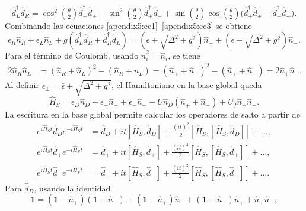 \begin{appendixs}
\begin{equation}
    \hat{d}^{\dagger}_{L}\hat{d}_{R} =
    \cos^{2}(\tfrac{\theta}{2})\hat{d}^{\dagger}_{-}\hat{d}_{+}
    - \sin^{2}(\tfrac{\theta}{2}) \hat{d}^{\dagger}_{+}\hat{d}_{-}
    + \sin(\tfrac{\theta}{2})\cos(\tfrac{\theta}{2})\big( \hat{d}^{\dagger}_{+}\hat{d}_{+} - \hat{d}^{\dagger}_{-}\hat{d}_{-} \big).
    \label{apendix5:ec3}
\end{equation}
Combinando las ecuaciones \eqref{apendix5:ec1}–\eqref{apendix5:ec3} se obtiene
\begin{equation*}
    \epsilon_{R} \hat{n}_{R} + \epsilon_{L} \hat{n}_{L}
    + g( \hat{d}^{\dagger}_{L}\hat{d}_{R} + \hat{d}^{\dagger}_{R}\hat{d}_{L} )
    = (\bar{\epsilon} + \sqrt{\Delta^{2} + g^{2}})\hat{n}_{+}
    +  (\bar{\epsilon} - \sqrt{\Delta^{2} + g^{2}})\hat{n}_{-}.
\end{equation*}
Para el término de Coulomb, usando $\hat{n}^{2}_{i} = \hat{n}_{i}$, se tiene
\begin{align*}
    2 \hat{n}_{R}\hat{n}_{L}
    &= (\hat{n}_{R} +\hat{n}_{L})^{2} - (\hat{n}_{R} + \hat{n}_{L})
     = (\hat{n}_{+} +\hat{n}_{-})^{2} - (\hat{n}_{+} + \hat{n}_{-})
     = 2\hat{n}_{+}\hat{n}_{-}.
\end{align*}
Al definir $\epsilon_{\pm} = \bar{\epsilon} \pm \sqrt{\Delta^{2}+g^{2}}$, el Hamiltoniano en la base global queda
\begin{equation}
    \hat{H}_{S} = \epsilon_{D}\hat{n}_{D} + \epsilon_{+}\hat{n}_{+} + \epsilon_{-}\hat{n}_{-}
    + U\hat{n}_{D}(\hat{n}_{+} + \hat{n}_{-}) + U_{f}\hat{n}_{+}\hat{n}_{-}.
    \label{apendix5:ec4}
\end{equation}
La escritura en la base global permite calcular los operadores de salto a partir de
\begin{align*}
    e^{i \hat{H}_{S}t}\hat{d}_{D}e^{-i\hat{H}_{S}t} & = \hat{d}_{D} + it[\hat{H}_{S},\hat{d}_{D}] + \frac{(it)^{2}}{2} [\hat{H}_{S},[\hat{H}_{S},\hat{d}_{D}]] + \dots, \\
    e^{i \hat{H}_{S}t}\hat{d}_{+}e^{-i\hat{H}_{S}t} & = \hat{d}_{+} + it[\hat{H}_{S},\hat{d}_{+}] + \frac{(it)^{2}}{2} [\hat{H}_{S},[\hat{H}_{S},\hat{d}_{+}]] + \dots, \\
    e^{i \hat{H}_{S}t}\hat{d}_{-}e^{-i\hat{H}_{S}t} & = \hat{d}_{-} + it[\hat{H}_{S},\hat{d}_{-}] + \frac{(it)^{2}}{2} [\hat{H}_{S},[\hat{H}_{S},\hat{d}_{-}]] + \dots.
\end{align*}
Para $\hat{d}_{D}$, usando la identidad
\[
\mathbf{1} = (\mathbf{1} - \hat{n}_{+})(\mathbf{1}-\hat{n}_{-}) + (\mathbf{1} - \hat{n}_{+})\hat{n}_{-} + (\mathbf{1} - \hat{n}_{-})\hat{n}_{+} + \hat{n}_{+}\hat{n}_{-},
\]
\end{appendixs}
